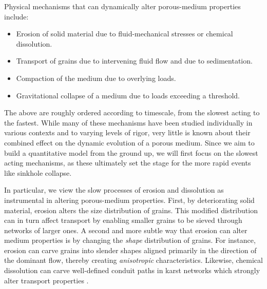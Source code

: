 \documentclass[12pt]{article}
\begin{document}
Physical mechanisms that can dynamically alter porous-medium properties include:
\begin{itemize}
\item Erosion of solid material due to fluid-mechanical stresses or chemical dissolution.
\item Transport of grains due to intervening fluid flow and due to sedimentation.
\item Compaction of the medium due to overlying loads.
\item Gravitational collapse of a medium due to loads exceeding a threshold.
\end{itemize}
The above are roughly ordered according to timescale, from the slowest acting to the fastest. While many of these mechanisms have been studied individually in various contexts and to varying levels of rigor, very little is known about their combined effect on the dynamic evolution of a porous medium. Since we aim to build a quantitative model from the ground up, we will first focus on the slowest acting mechanisms, as these ultimately set the stage for the more rapid events like sinkhole collapse. 

In particular, we view the slow processes of erosion and dissolution as instrumental in altering porous-medium properties. First, by deteriorating solid material, erosion alters the size distribution of grains. This modified distribution can in turn affect transport by enabling smaller grains to be sieved through networks of larger ones. A second and more subtle way that erosion can alter medium properties is by changing the {\em shape} distribution of grains. For instance, erosion can carve grains into slender shapes aligned primarily in the direction of the dominant flow, thereby creating {\em anisotropic} characteristics. Likewise, chemical dissolution can carve well-defined conduit paths in karst networks which strongly alter transport properties \cite{szymczak2009wormhole}.
\end{document}
